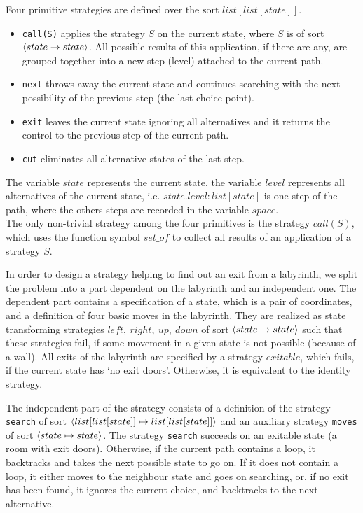 Four primitive strategies are defined over the sort $list[list[state]]$.
\begin{itemize}
 \item  \texttt{call(S)}  applies the strategy $S$ on the current state,
        where $S$ is of sort $\langle state \rightarrow state \rangle$.
        All possible results of this application, if there are any,
        are grouped together into a new step (level)
        attached to the current path.
 \item  \texttt{next} throws away the current state and continues searching with
        the next possibility of the previous step (the last choice-point).
 \item  \texttt{exit} leaves the current state ignoring all alternatives
        and it returns the control to the previous step of the current path.
 \item  \texttt{cut} eliminates all alternative states of the last step.
\end{itemize}


The variable $state$ represents the current state, the variable $level$
represents all alternatives of the current state, i.e.
$state.level:list[state]$ is one step of the path, where the others
steps are recorded in the variable $space$.    \\
%
The only non-trivial strategy among the four primitives is
the strategy $call(S)$, which uses the function symbol $set\_of$ to 
collect all results of an application of a strategy $S$.

In order to design a strategy helping to find out an exit from a labyrinth, we
split the problem into a part dependent on the labyrinth and an independent one.
The dependent part contains a specification of a state, which is a pair of
coordinates, and a definition of four basic moves in the labyrinth.  They are
realized as state transforming strategies $left,~right,~up,~down$ of sort
$\langle state \rightarrow state \rangle$ such that these strategies fail, if some movement
in a given state is not possible (because of a wall). All exits of the labyrinth
are specified by a strategy $exitable$, which fails, if the current state has
`no exit doors'. Otherwise, it is equivalent to the identity strategy.


The independent part of the strategy consists of a definition of the strategy
\texttt{search} of sort $\langle list[list[state]] \mapsto list[list[state]] \rangle$ and an
auxiliary strategy \texttt{moves} of sort $\langle state \mapsto state \rangle$.  The strategy
\texttt{search} succeeds on an exitable state (a room with exit doors).  Otherwise, if
the current path contains a loop, it backtracks and takes the next possible
state to go on.  If it does not contain a loop, it either moves to the
neighbour state and goes on searching, or, if no exit has been found, it
ignores the current choice, and backtracks to the next alternative.

